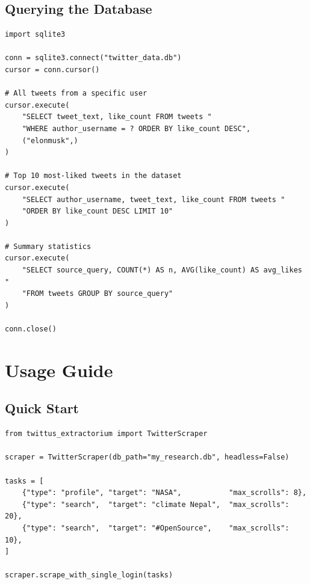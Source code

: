 \documentclass[11pt, a4paper]{article}
\begin{document}
\subsection{Querying the Database}

\begin{tcolorbox}[pybox, title=Example queries]
\begin{lstlisting}[style=pycode]
import sqlite3

conn = sqlite3.connect("twitter_data.db")
cursor = conn.cursor()

# All tweets from a specific user
cursor.execute(
    "SELECT tweet_text, like_count FROM tweets "
    "WHERE author_username = ? ORDER BY like_count DESC",
    ("elonmusk",)
)

# Top 10 most-liked tweets in the dataset
cursor.execute(
    "SELECT author_username, tweet_text, like_count FROM tweets "
    "ORDER BY like_count DESC LIMIT 10"
)

# Summary statistics
cursor.execute(
    "SELECT source_query, COUNT(*) AS n, AVG(like_count) AS avg_likes "
    "FROM tweets GROUP BY source_query"
)

conn.close()
\end{lstlisting}
\end{tcolorbox}

\section{Usage Guide}

\subsection{Quick Start}

\begin{tcolorbox}[pybox, title=Minimal usage example]
\begin{lstlisting}[style=pycode]
from twittus_extractorium import TwitterScraper

scraper = TwitterScraper(db_path="my_research.db", headless=False)

tasks = [
    {"type": "profile", "target": "NASA",           "max_scrolls": 8},
    {"type": "search",  "target": "climate Nepal",  "max_scrolls": 20},
    {"type": "search",  "target": "#OpenSource",    "max_scrolls": 10},
]

scraper.scrape_with_single_login(tasks)
\end{lstlisting}
\end{tcolorbox}
\end{document}
